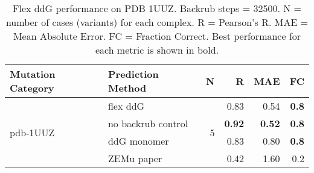 \begin{table}
  \begin{tabular}{llrrrr}
\toprule
Mutation Category &   Prediction Method &  N &    R &  MAE &  FC \\
\midrule
 \multirow{ 4}{*}{pdb-1UUZ} & flex ddG & \multirow{ 4}{*}{5} & 0.83 & 0.54 & \textbf{0.8}  \\
 & no backrub control & & \textbf{0.92} & \textbf{0.52} & \textbf{0.8}  \\
 & ddG monomer & & 0.83 & 0.80 & \textbf{0.8}  \\
 & ZEMu paper & & 0.42 & 1.60 & 0.2  \\
\bottomrule
\end{tabular}
  \caption[Flex ddG performance on PDB 1UUZ]{
    Flex ddG performance on PDB 1UUZ. Backrub steps = 32500. N = number of cases (variants) for each complex. R = Pearson's R. MAE = Mean Absolute Error. FC = Fraction Correct. Best performance for each metric is shown in bold.
  } \label{tab:table-pdb-1UUZ}
\end{table}
